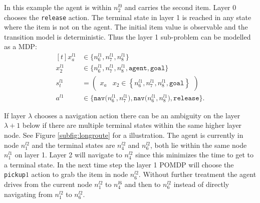 \begin{example}
In this example the agent is within $n_2^{l0}$ and carries the second item. Layer 0 chooses the \texttt{release} action. The terminal state in layer 1 is reached in any state where the item is not on the agent. The initial item value is observable and the transition model is deterministic. Thus the layer 1 sub-problem can be modelled as a MDP:
\begin{equation}
    \begin{aligned}[t] 
        x_a^{l1} &\in \big\{ n_6^{l1}, n_7^{l1}, n_8^{l1} \big\} \\
        x_2^{l1} &\in  \big\{ n_6^{l1}, n_7^{l1}, n_8^{l1}, \texttt{agent}, \texttt{goal} \big\}\\
        s_t^{l1} &= \begin{pmatrix} x_a & x_2\in\left\{ n_6^{l1}, n_7^{l1}, n_8^{l1}, \texttt{goal} \right\} \end{pmatrix}\\
        a^{l1} &\in \big\{\texttt{nav($n_6^{l1}, n_7^{l1}$)}, \texttt{nav($n_6^{l1}, n_8^{l1}$)}, \texttt{release} \big\}.
        \end{aligned}
\end{equation}
\demo
\end{example}
%
If layer $\lambda$ chooses a navigation action there can be an ambiguity on the layer $\lambda+1$ below if there are multiple terminal states within the same higher layer node. See Figure \ref{subfig:longroute} for a illustration. The agent is currently in node $n_1^{l2}$ and the terminal states are $n_4^{l2}$ and $n_6^{l2}$, both lie within the same node $n_1^{l1}$ on layer 1. Layer 2 will navigate to $n_4^{l2}$ since this minimizes the time to get to a terminal state. In the next time step the layer 1 POMDP will choose the \texttt{pickup}$1$ action to grab the item in node $n_6^{l2}$. Without further treatment the agent drives from the current node $n_1^{l2}$ to $n_4^{l6}$ and then to $n_6^{l2}$ instead of directly navigating from $n_1^{l2}$ to $n_6^{l2}$. \\


